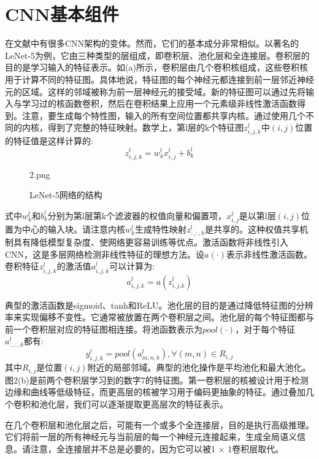 \documentclass[final]{cvpr}
\begin{document}
\section{CNN基本组件}
\label{sec:RelatedWorks}
在文献中有很多CNN架构的变体。然而，它们的基本成分非常相似。以著名的LeNet-5为例，它由三种类型的层组成，即卷积层、池化层和全连接层。卷积层的目的是学习输入的特征表示。如(a)所示，卷积层由几个卷积核组成，这些卷积核用于计算不同的特征图。具体地说，特征图的每个神经元都连接到前一层邻近神经元的区域。这样的邻域被称为前一层神经元的接受域。新的特征图可以通过先将输入与学习过的核函数卷积，然后在卷积结果上应用一个元素级非线性激活函数得到。注意，要生成每个特性图，输入的所有空间位置都共享内核。通过使用几个不同的内核，得到了完整的特征映射。数学上，第l层的k个特征图$z^l_{i,j,k}$中$(i,j)$位置的特征值是这样计算的:
\begin{equation}
z^l_{i,j,k}=w^l_kx^l_{i,j}+b^l_k
\end{equation}
\begin{figure}[t!]
	\begin{overpic}[width=\columnwidth]{2.png}
	\end{overpic}
	\caption{LeNet-5网络的结构
	}\label{fig:LeNet}
\end{figure}

式中$w^l_k$和$b^l_k$分别为第l层第k个滤波器的权值向量和偏置项，$x^l_{i,j}$是以第l层$(i, j)$位置为中心的输入块。请注意内核$w^l_k$生成特性映射$z^l_{:,:,k}$是共享的。这种权值共享机制具有降低模型复杂度、使网络更容易训练等优点。激活函数将非线性引入CNN，这是多层网络检测非线性特征的理想方法。设$a(·)$表示非线性激活函数。卷积特征$z^l_{i,j,k}$的激活值$a^l_{i,j,k}$可以计算为:
\begin{equation}
	a^l_{i,j,k}=a(z^l_{i,j.k})
\end{equation}

典型的激活函数是sigmoid、tanh和ReLU。池化层的目的是通过降低特征图的分辨率来实现偏移不变性。它通常被放置在两个卷积层之间。池化层的每个特征图都与前一个卷积层对应的特征图相连接。将池函数表示为$pool(·)$，对于每个特征$a^l_{:,:,k}$都有:
\begin{equation}
	y^l_{i,j,k}=pool(a^l_{m,n,k}),\forall(m,n)\in R_{i,j}
\end{equation}
其中$R_{i,j}$是位置$(i, j)$附近的局部邻域。典型的池化操作是平均池化和最大池化。图2(b)是前两个卷积层学习到的数字7的特征图。第一卷积层的核被设计用于检测边缘和曲线等低级特征，而更高层的核被学习用于编码更抽象的特征。通过叠加几个卷积和池化层，我们可以逐渐提取更高层次的特征表示。

在几个卷积层和池化层之后，可能有一个或多个全连接层，目的是执行高级推理。它们将前一层的所有神经元与当前层的每一个神经元连接起来，生成全局语义信息。请注意，全连接层并不总是必要的，因为它可以被1 × 1卷积层取代。
\end{document}
